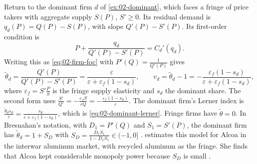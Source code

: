 \begin{example}\label{ex:02-dominant-conduct}
Return to the dominant firm $d$ of \cref{ex:02-dominant}, which faces a fringe of price takers with aggregate supply
$S(P)$, $S' \ge 0$. Its residual demand is $q_d(P) = Q(P) - S(P)$, with slope $Q'(P) - S'(P)$. Its first-order
condition is
\begin{equation*}
P + \frac{q_d}{Q'(P) - S'(P)} = C_d'(q_d) .
\end{equation*}
Writing this as \eqref{eq:02-firm-foc} with $P'(Q) = \frac{1}{Q'(P)}$ gives
\begin{equation*}
\tilde\theta_d = \frac{Q'(P)}{Q'(P) - S'(P)} = \frac{\varepsilon}{\varepsilon + \varepsilon_f (1 - s_d)} ,
\qquad
v_d = \tilde\theta_d - 1 = -\frac{\varepsilon_f (1 - s_d)}{\varepsilon + \varepsilon_f (1 - s_d)} ,
\end{equation*}
where $\varepsilon_f = S'\frac{P}{S}$ is the fringe supply elasticity and $s_d$ the dominant share. The second form
uses $\frac{S'}{Q'} = -\frac{\varepsilon_f S}{\varepsilon Q} = -\frac{\varepsilon_f (1 - s_d)}{\varepsilon}$. The
dominant firm's Lerner index is $\frac{\tilde\theta_d s_d}{\varepsilon} = \frac{s_d}{\varepsilon +
\varepsilon_f(1 - s_d)}$, which is \eqref{eq:02-dominant-lerner}. Fringe firms have $\tilde\theta = 0$. In
Bresnahan's notation, with $D_1 = P'(Q)$ and $S_1 = S'(P)$, the dominant firm has $\tilde\theta_d = 1 + S_D$ with
$S_D = \frac{D_1 S_1}{1 - D_1 S_1} \in (-1, 0]$ \citep[eqs.~(11) and (11$'$), p.~1023]{Bresnahan1989}.
\citet{Suslow1986} estimates this model for Alcoa in the interwar aluminum market, with recycled aluminum as the
fringe. She finds that Alcoa kept considerable monopoly power because $S_D$ is small
\citep[p.~1023]{Bresnahan1989}.
\end{example}


